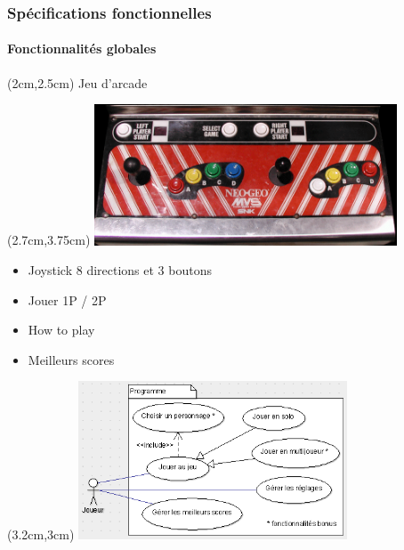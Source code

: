 \begin{frame}

	\frametitle{Spécifications fonctionnelles}
	\framesubtitle{Fonctionnalités globales}
	
	{
		\begin{textblock*}{9cm}(2cm,2.5cm)
			{\LARGE Jeu d'arcade}
			\vfill
		\end{textblock*}
	}
	
	{
		\begin{textblock*}{9cm}(2.7cm,3.75cm)
			\includegraphics[width=9cm]{figures/panneau_de_controle_Neo_Geo_MVS_2p.png}
		\end{textblock*}
	}
	
	{
		
		\begin{itemize}
			[triangle]
			\item<2> Joystick 8 directions et 3 boutons
		\end{itemize}
		\begin{itemize}
			[triangle]
			\item<2> Jouer 1P / 2P
		\end{itemize}
		\begin{itemize}
			[triangle]
			\item<2> How to play
		\end{itemize}
		\begin{itemize}
			[triangle]
			\item<2> Meilleurs scores
		\end{itemize}
	}
	
	{
		\begin{textblock*}{8cm}(3.2cm,3cm)
			\includegraphics[width=8cm]{figures/use_case_metal_slug_general.png}
		\end{textblock*}
	}
	
\end{frame}

